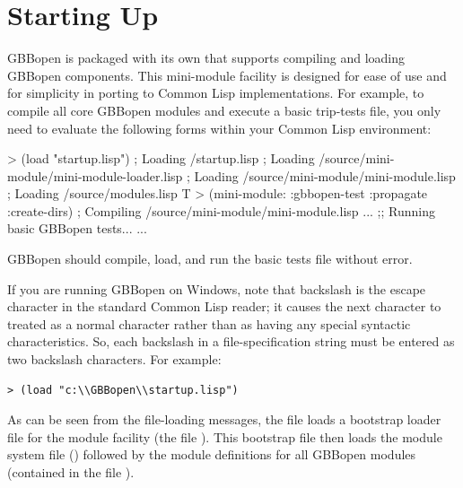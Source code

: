 \documentclass[10pt,twoside,english,pdftex]{article}
\begin{document}

\T\markright{}%
\T\pagestyle{plain}
\T\cleardoublepage
\W{}
\T\pagestyle{fancy}
\T\thispagestyle{fancybottom}
\W{}
\T\global\def\fnlastname{ }%
\section{Starting Up}
\label{sec:startup}%

GBBopen is packaged with its own  that supports compiling and loading GBBopen
components.  This mini-module facility is designed for ease of use and
for simplicity in porting to Common Lisp implementations.  For
example, to compile all core GBBopen modules and execute a basic
trip-tests file, you only need to evaluate the following forms within
your Common Lisp environment:
\begin{example}
> (load "startup.lisp")
; Loading /startup.lisp
;  Loading /source/mini-module/mini-module-loader.lisp
;   Loading /source/mini-module/mini-module.lisp
;  Loading /source/modules.lisp
T
> (mini-module: :gbbopen-test :propagate :create-dirs)
; Compiling /source/mini-module/mini-module.lisp
     ...
;; Running basic GBBopen tests...
     ...
\end{example}

GBBopen should compile, load, and run the basic tests file without error.

%
%
If you are running GBBopen on Windows, note that backslash is the
escape character in the standard Common Lisp reader; it causes the
next character to treated as a normal character rather than as having
any special syntactic characteristics. So, each backslash in a
file-specification string must be entered as two backslash characters.
For example:
\begin{verbatim}
> (load "c:\\GBBopen\\startup.lisp")
\end{verbatim}

As can be seen from the file-loading messages, the 
file loads a bootstrap loader file for the module facility (the file
).  This bootstrap
file then loads the module system file
() followed by the module
definitions for all GBBopen modules (contained in the file
).
\end{document}
